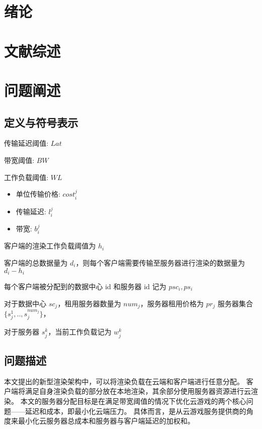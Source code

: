 
\chapter{绪论} \label{chpt:A}

\chapter{文献综述}

\chapter{问题阐述}

\section{定义与符号表示}

传输延迟阈值: $Lat$

带宽阈值: $BW$

工作负载阈值: $WL$


\begin{itemize}
    \item 单位传输价格: $cost_i^j$
    \item 传输延迟: $l_i^j$
    \item 带宽: $b_i^j$
\end{itemize}


客户端的渲染工作负载阈值为 $ h_i $

客户端的总数据量为 $ d_i $，则每个客户端需要传输至服务器进行渲染的数据量为 $ d_i-h_i $

每个客户端被分配到的数据中心 id 和服务器 id 记为 $ psc_i,ps_i $


对于数据中心 $sc_j$，租用服务器数量为 $num_j$，服务器租用价格为 $ pr_j $
服务器集合 $\{s_j^1,..,s_j^{num_j}\}$，

对于服务器 $s_j^k$，当前工作负载记为 $w_{j}^k$

\section{问题描述}
本文提出的新型渲染架构中，可以将渲染负载在云端和客户端进行任意分配。
客户端将满足自身渲染负载的部分放在本地渲染，其余部分使用服务器资源进行云渲染。
本文的服务器分配目标是在满足带宽阈值的情况下优化云游戏的两个核心问题——延迟和成本，即最小化云端压力。
具体而言，是从云游戏服务提供商的角度来最小化云服务器总成本和服务器与客户端延迟的加权和。

